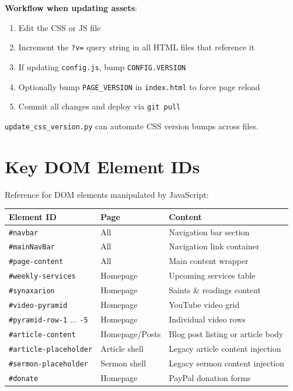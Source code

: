 \documentclass[12pt]{article}
\begin{document}
\textbf{Workflow when updating assets}:
\begin{enumerate}
    \item Edit the CSS or JS file
    \item Increment the \texttt{?v=} query string in all HTML files that reference it
    \item If updating \texttt{config.js}, bump \texttt{CONFIG.VERSION}
    \item Optionally bump \texttt{PAGE\_VERSION} in \texttt{index.html} to force page reload
    \item Commit all changes and deploy via \texttt{git pull}
\end{enumerate}

\texttt{update\_css\_version.py} can automate CSS version bumps across files.

\section{Key DOM Element IDs}

Reference for DOM elements manipulated by JavaScript:

\begin{longtable}{p{4.5cm}p{3.2cm}p{5.3cm}}
\toprule
\textbf{Element ID} & \textbf{Page} & \textbf{Content} \\
\midrule
\texttt{\#navbar} & All & Navigation bar section \\
\texttt{\#mainNavBar} & All & Navigation link container \\
\texttt{\#page-content} & All & Main content wrapper \\
\texttt{\#weekly-services} & Homepage & Upcoming services table \\
\texttt{\#synaxarion} & Homepage & Saints \& readings content \\
\texttt{\#video-pyramid} & Homepage & YouTube video grid \\
\texttt{\#pyramid-row-1} ... \texttt{-5} & Homepage & Individual video rows \\
\texttt{\#article-content} & Homepage/Posts & Blog post listing or article body \\
\texttt{\#article-placeholder} & Article shell & Legacy article content injection \\
\texttt{\#sermon-placeholder} & Sermon shell & Legacy sermon content injection \\
\texttt{\#donate} & Homepage & PayPal donation forms \\
\bottomrule
\end{longtable}
\end{document}
